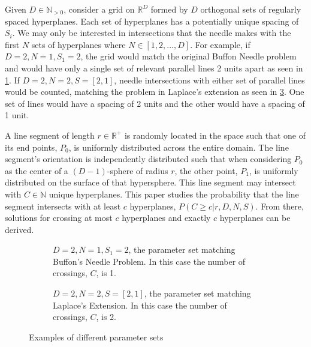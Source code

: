 \documentclass{article}
\begin{document}
Given $D\in\mathbb{N}_{>0}$, consider a grid on $\mathbb{R}^D$ formed by $D$ orthogonal sets of regularly spaced hyperplanes. Each set of hyperplanes
has a potentially unique spacing of $S_i$. We may only be interested in intersections that the needle makes 
with the first $N$ sets of hyperplanes where $N\in[1,2,\dots,D]$. For example, if $D=2, N=1, S_1=2$, the
grid would match the original Buffon Needle problem and would have only a single set of relevant parallel lines 2
units apart as seen in \ref{fig:buffon example}. If $D=2, N=2, S=[2, 1]$, needle intersections with either
set of parallel lines would be counted, matching the problem in Laplace's extension as seen in 
\ref{fig:laplace example}. One set of lines would have a spacing of 2 units and the other would have a 
spacing of 1 unit.

A line segment of length $r\in\mathbb{R}^+$ is randomly located in the space such that one of its end points, $P_0$, is uniformly distributed
across the entire domain. The line segment's orientation is independently distributed such that when considering $P_0$ as the center of a $(D-1)$-sphere of radius $r$, the other point, $P_1$,
is uniformly distributed on the surface of that hypersphere. This line segment may intersect with $C\in\mathbb{N}$ unique hyperplanes. This paper studies the probability that the line segment
intersects with at least $c$ hyperplanes, $P(C\ge c|r, D, N, S)$. From there, solutions for crossing at most $c$ hyperplanes and exactly $c$ hyperplanes can
be derived.
\begin{figure}[H]
	\centering
	\begin{subfigure}{0.45\textwidth}
		\centering
		\caption{$D=2, N=1, S_1=2$, the parameter set matching Buffon's Needle Problem. In this case the number of crossings, $C$, is 1.}
		\label{fig:buffon example}
	\end{subfigure}
	\hspace{1cm}
	\begin{subfigure}{0.45\textwidth}
		\centering
		\caption{$D=2, N=2, S=[2,1]$, the parameter set matching Laplace's Extension. In this case the number of crossings, $C$, is 2.}
		\label{fig:laplace example}
	\end{subfigure}
	\caption{Examples of different parameter sets}
\end{figure}
\end{document}
